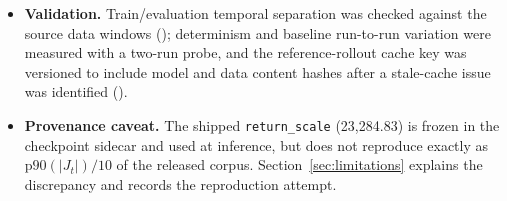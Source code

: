 \documentclass{article}
\begin{document}
\begin{itemize}
  Supporting artifacts are  (dispatch
  replay) and  (prompt slope in Figure~\ref{fig:jtsoc},
  recomputed by ). The older
   and
   compare against the historical
  204{,}800-step default PPO reference and are superseded (provenance E3,
  C3--C5); see .
  \item \textbf{Validation.} Train/evaluation temporal separation was checked
  against the source data windows
  (); determinism and baseline
  run-to-run variation were measured with a two-run probe, and the
  reference-rollout cache key was versioned to include model and data content
  hashes after a stale-cache issue was identified
  ().
  \item \textbf{Provenance caveat.} The shipped \texttt{return\_scale}
  (23{,}284.83) is frozen in the checkpoint sidecar and used at inference, but
  does not reproduce exactly as $\mathrm{p90}(|J_t|)/10$ of the released
  corpus. Section~\ref{sec:limitations} explains the discrepancy and
   records the reproduction attempt.
\end{itemize}
\end{document}
